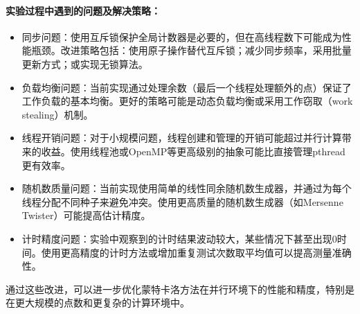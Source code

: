 \documentclass{SYSUReport}
\begin{document}
\paragraph{实验过程中遇到的问题及解决策略：}
\begin{itemize}
    \item 同步问题：使用互斥锁保护全局计数器是必要的，但在高线程数下可能成为性能瓶颈。改进策略包括：使用原子操作替代互斥锁；减少同步频率，采用批量更新方式；或实现无锁算法。
    
    \item 负载均衡问题：当前实现通过处理余数（最后一个线程处理额外的点）保证了工作负载的基本均衡。更好的策略可能是动态负载均衡或采用工作窃取（work stealing）机制。
    
    \item 线程开销问题：对于小规模问题，线程创建和管理的开销可能超过并行计算带来的收益。使用线程池或OpenMP等更高级别的抽象可能比直接管理pthread更有效率。
    
    \item 随机数质量问题：当前实现使用简单的线性同余随机数生成器，并通过为每个线程分配不同种子来避免冲突。使用更高质量的随机数生成器（如Mersenne Twister）可能提高估计精度。
    
    \item 计时精度问题：实验中观察到的计时结果波动较大，某些情况下甚至出现0时间。使用更高精度的计时方法或增加重复测试次数取平均值可以提高测量准确性。
\end{itemize}

通过这些改进，可以进一步优化蒙特卡洛方法在并行环境下的性能和精度，特别是在更大规模的点数和更复杂的计算环境中。
\end{document}
